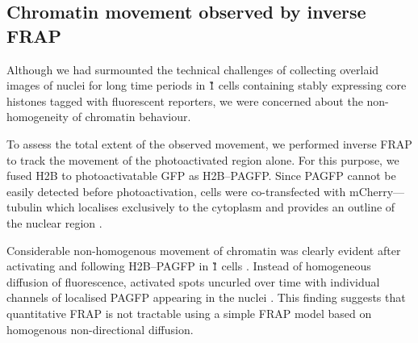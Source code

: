     \subsection{Chromatin movement observed by inverse FRAP}

    Although we had surmounted the technical challenges of collecting
    overlaid images of nuclei for long time periods
    in \G1{} cells containing stably expressing
    core histones tagged with fluorescent reporters,
    we were concerned about the non-homogeneity of chromatin behaviour.

    To assess the total extent of the observed movement,
    we performed inverse FRAP
    to track the movement of the photoactivated region alone.
    For this purpose, we fused H2B to photoactivatable GFP as H2B--PAGFP.
    Since PAGFP cannot be easily detected before photoactivation,
    cells were co-transfected with mCherry--\textalpha--tubulin
    which localises exclusively to the cytoplasm
    and provides an outline of the nuclear region
    .

    Considerable non-homogenous movement of chromatin was clearly evident
    after activating and following H2B--PAGFP in
    \G1{} cells .
    Instead of homogeneous diffusion of fluorescence,
    activated spots uncurled over time with individual channels of
    localised PAGFP appearing in the nuclei .
    This finding suggests that quantitative FRAP is not tractable using
    a simple FRAP model based on homogenous non-directional diffusion.

